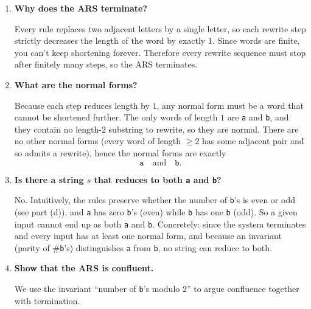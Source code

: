 \documentclass{article}
\theoremstyle{plain}
\theoremstyle{definition}
\theoremstyle{remark}
\begin{document}
\begin{enumerate}[label=(\alph*)]
  \item \textbf{Why does the ARS terminate?}
  
  Every rule replaces two adjacent letters by a single letter, so each rewrite step strictly decreases the length of the word by exactly $1$. Since words are finite, you can't keep shortening forever. Therefore every rewrite sequence must stop after finitely many steps, so the ARS terminates.
  
  \item \textbf{What are the normal forms?}
  
  Because each step reduces length by $1$, any normal form must be a word that cannot be shortened further. The only words of length $1$ are \texttt{a} and \texttt{b}, and they contain no length-$2$ substring to rewrite, so they are normal. There are no other normal forms (every word of length $\ge 2$ has some adjacent pair and so admits a rewrite), hence the normal forms are exactly
  \[
    \texttt{a}\quad\text{and}\quad\texttt{b}.
  \]
  
  \item \textbf{Is there a string \(s\) that reduces to both \texttt{a} and \texttt{b}?}
  
  No. Intuitively, the rules preserve whether the number of \texttt{b}'s is even or odd (see part (d)), and \texttt{a} has zero \texttt{b}'s (even) while \texttt{b} has one \texttt{b} (odd). So a given input cannot end up as both \texttt{a} and \texttt{b}. Concretely: since the system terminates and every input has at least one normal form, and because an invariant (parity of \#\texttt{b}'s) distinguishes \texttt{a} from \texttt{b}, no string can reduce to both.
  
  \item \textbf{Show that the ARS is confluent.}
  
  We use the invariant ``number of \texttt{b}'s modulo $2$'' to argue confluence together with termination.
  

\end{enumerate}
\end{document}
